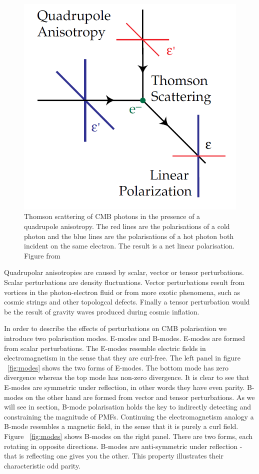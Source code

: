 \begin{figure}[h]
\centering
\includegraphics[scale=0.35]{images/thomson.png}
\caption{Thomson scattering of CMB photons in the presence of a quadrupole anisotropy. The red lines are the polarisations of a cold photon and the blue lines are the polarisations of a hot photon both incident on the same electron. The result is a net linear polarisation. Figure from \cite{Hu:1997hv}}
\label{fig:thomson}
\end{figure}

Quadrupolar anisotropies are caused by scalar, vector or tensor perturbations. Scalar perturbations are density fluctuations. Vector perturbations result from vortices in the photon-electron fluid or from more exotic phenomena, such as cosmic strings and other topologcal defects. Finally a tensor perturbation would be the result of gravity waves produced during cosmic inflation.  

In order to describe the effects of perturbations on CMB polarisation we introduce two polarisation modes. E-modes and B-modes. E-modes are formed from scalar perturbations. The E-modes resemble electric fields in electromagnetism in the sense that they are curl-free. The left panel in figure ~\ref{fig:modes} shows the two forms of E-modes. The bottom mode has zero divergence whereas the top mode has non-zero divergence. It is clear to see that E-modes are symmetric under reflection, in other words they have even parity. B-modes on the other hand are formed from vector and tensor perturbations. As we will see in section, B-mode polarisation holds the key to indirectly detecting and constraining the magnitude of PMFs. Continuing the electromagnetism analogy a B-mode resembles a magnetic field, in the sense that it is purely a curl field. Figure ~\ref{fig:modes} shows B-modes on the right panel. There are two forms, each rotating in opposite directions. B-modes are anti-symmetric under reflection - that is reflecting one gives you the other. This property illustrates their characteristic odd parity.

